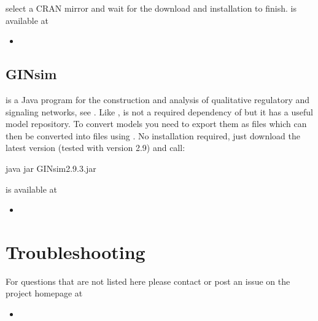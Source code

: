 \documentclass[letterpaper,10pt,english]{sphinxmanual}
\begin{document}
select a CRAN mirror and wait for the download and installation to finish.
 is available at
\begin{itemize}
\item {} 

\end{itemize}


\subsection{GINsim}
\label{\detokenize{Installation:installation-ginsim}}\label{\detokenize{Installation:ginsim}}
 is a Java program for the construction and analysis of qualitative regulatory and signaling networks, see {\hyperref[\detokenize{Bibliography:chaouiya2012}]{}}.
Like ,  is not a required dependency of  but it has a useful model repository. To convert  models you need to export them as  files which can then be converted into  files using .
No installation required, just download the latest version (tested with version 2.9) and call:

\begin{sphinxVerbatim}[commandchars=\\\{\}]
\PYGZdl{} java \PYGZhy{}jar GINsim\PYGZhy{}2.9.3.jar
\end{sphinxVerbatim}

 is available at
\begin{itemize}
\item {} 

\end{itemize}


\section{Troubleshooting}
\label{\detokenize{Installation:installation-troubleshooting}}\label{\detokenize{Installation:troubleshooting}}
For questions that are not listed here please contact  or post an issue on the project homepage at
\begin{itemize}
\item {} 

\end{itemize}
\end{document}
